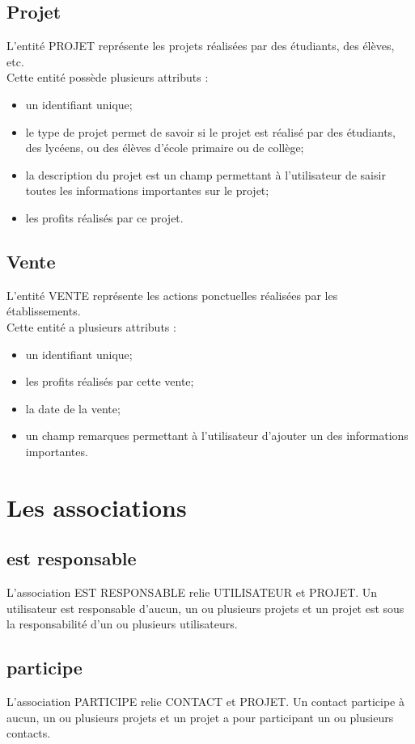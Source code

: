 \documentclass[asi, sansVersion]{picINSA}
\begin{document}
\subsection*{Projet}
L'entité PROJET représente les projets réalisées par des étudiants, des élèves, etc. \\
Cette entité possède plusieurs attributs : 
\begin{itemize}
\item un identifiant unique;
\item  le type de projet permet de savoir si le projet est réalisé par des étudiants, des lycéens, ou des élèves d'école primaire ou de collège; 
\item la description du projet est un champ permettant à l'utilisateur de saisir toutes les informations importantes sur le projet;
\item les profits réalisés par ce projet.
\end{itemize}

\subsection*{Vente}
L'entité VENTE représente les actions ponctuelles réalisées par les établissements. \\ 
Cette entité a plusieurs attributs : 
\begin{itemize}
\item un identifiant unique; 
\item les profits réalisés par cette vente;
\item la date de la vente;
\item un champ remarques permettant à l'utilisateur d'ajouter un des informations importantes. 
\end{itemize}
\section{Les associations}

\subsection*{est responsable}
L'association EST RESPONSABLE relie UTILISATEUR et PROJET. Un utilisateur est responsable d'aucun, un ou plusieurs projets et un projet est sous la responsabilité d'un ou plusieurs utilisateurs.

\subsection*{participe}
L'association PARTICIPE relie CONTACT et PROJET. Un contact participe à aucun, un ou plusieurs projets et un projet a pour participant un ou plusieurs contacts.
\end{document}
